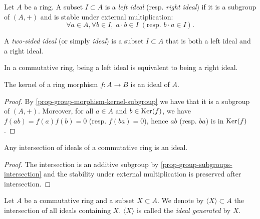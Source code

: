 \documentclass[12pt]{report}
\begin{document}
\begin{definition} \label{def-ring-ideal}
    Let $A$ be a ring. A subset $I \subset A$ is a \emph{left ideal} (resp. \emph{right ideal}) if it is a subgroup of $(A, +)$ and is stable under external multiplication:
    \[
        \forall a \in A, \forall b \in I, \; a \cdot b \in I \; (\text{resp. } b \cdot a \in I).
    \]
\end{definition}

\begin{definition} \label{def-ring-ideal-two-sided}
    A \emph{two-sided ideal} (or simply \emph{ideal}) is a subset $I \subset A$ that is both a left ideal and a right ideal.
\end{definition}

\begin{remark}
    In a commutative ring, being a left ideal is equivalent to being a right ideal.
\end{remark}

\begin{proposition} \label{prop-ring-morphism-kernel-ideal}
    The kernel of a ring morphism $f \colon A \to B$ is an ideal of $A$.
\end{proposition}

\begin{proof}
    By \ref{prop-group-morphism-kernel-subgroup} we have that it is a subgroup of $(A, +)$. Moreover, for all $a \in A$ and $b \in \operatorname{Ker} (f)$, we have $f(ab) = f(a) f(b) = 0$ (resp. $f(ba) = 0$), hence $ab$ (resp. $ba$) is in $\operatorname{Ker} (f)$.
\end{proof}

\begin{proposition} \label{prop-ring-ideal-intersection}
    Any intersection of ideals of a commutative ring is an ideal.
\end{proposition}

\begin{proof}
    The intersection is an additive subgroup by \ref{prop-group-subgroups-intersection} and the stability under external multiplication is preserved after intersection.
\end{proof}

\begin{definition} \label{def-ring-ideal-generated}
    Let $A$ be a commutative ring and a subset $X \subset A$. We denote by $\langle X \rangle \subset A$ the intersection of all ideals containing $X$. $\langle X \rangle$ is called the \emph{ideal generated} by $X$.
\end{definition}
\end{document}
